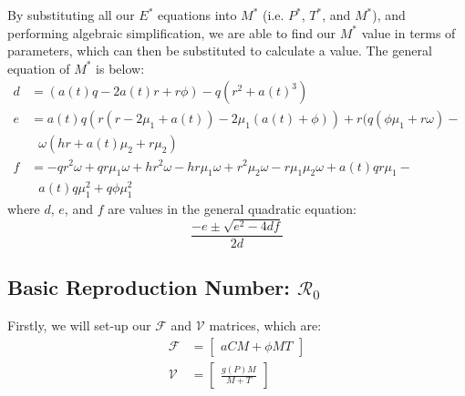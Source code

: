 \documentclass[12pt]{article}
\begin{document}
    By substituting all our $E^{*}$ equations into $M^{*}$ (i.e. $P^{*}$, $T^{*}$, and $M^{*}$), and performing algebraic simplification, we are able to find our $M^{*}$ value in terms of parameters, which can then be substituted to calculate a value. The general equation of $M^{*}$ is below:
    \begin{align*}
        d &= (a(t)q-2a(t)r+r \phi ) - q(r^{2}+a(t)^{3})\\
        e &= a(t)q(r(r-2\mu_{1}+a(t))-2\mu_{1}(a(t)+\phi )) +  r(q(\phi \mu_{1} + r \omega ) - \\ & \ \ \  \omega(hr+a(t) \mu_{2} + r\mu_{2})\\
        f &= -qr^{2} \omega +qr\mu_{1} \omega + hr^{2} \omega - hr\mu_{1} \omega + r^2 \mu_{2} \omega - r \mu_{1} \mu_{2} \omega + a(t)qr \mu_{1} - \\ & \ \ \  a(t)q\mu_{1}^{2} +q\phi \mu_{1}^{2}
    \end{align*}
    where $d$, $e$, and $f$ are values in the general quadratic equation:
    $$\frac{-e \pm \sqrt{e^2 - 4df}}{2d}$$

    \subsection{Basic Reproduction Number: $\mathscr{R}_0$}
        \label{appendix:A3}
        Firstly, we will set-up our $\mathscr{F}$ and $\mathscr{V}$ matrices, which are:
        \begin{align*}
            \mathscr{F} &= \begin{bmatrix}
                            aCM + \phi MT
                          \end{bmatrix}\\
            \mathscr{V} &= \begin{bmatrix}
                            \frac{g(P)M}{M+T}
                          \end{bmatrix}              
        \end{align*}
        
\end{document}
